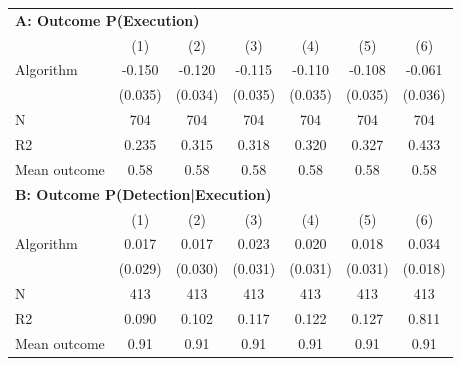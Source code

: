 \begin{tabular}{lcccccc} \toprule
\multicolumn{7}{l}{\textbf{A: Outcome P(Execution)}} \\ \multicolumn{1}{l}{} & (1) & (2) & (3) & (4) & (5) & (6) \\ \midrule
Algorithm   &      -0.150\sym{***}&      -0.120\sym{***}&      -0.115\sym{***}&      -0.110\sym{***}&      -0.108\sym{***}&      -0.061\sym{*}  \\
            &     (0.035)         &     (0.034)         &     (0.035)         &     (0.035)         &     (0.035)         &     (0.036)         \\
\midrule
N           &         704         &         704         &         704         &         704         &         704         &         704         \\
R2          &       0.235         &       0.315         &       0.318         &       0.320         &       0.327         &       0.433         \\
Mean outcome&        0.58         &        0.58         &        0.58         &        0.58         &        0.58         &        0.58         \\

\midrule \multicolumn{7}{l}{\textbf{B: Outcome P(Detection|Execution)}} \\ \multicolumn{1}{l}{} & (1) & (2) & (3) & (4) & (5) & (6) \\ \midrule
Algorithm   &       0.017         &       0.017         &       0.023         &       0.020         &       0.018         &       0.034\sym{*}  \\
            &     (0.029)         &     (0.030)         &     (0.031)         &     (0.031)         &     (0.031)         &     (0.018)         \\
\midrule
N           &         413         &         413         &         413         &         413         &         413         &         413         \\
R2          &       0.090         &       0.102         &       0.117         &       0.122         &       0.127         &       0.811         \\
Mean outcome&        0.91         &        0.91         &        0.91         &        0.91         &        0.91         &        0.91         \\


\end{tabular}
